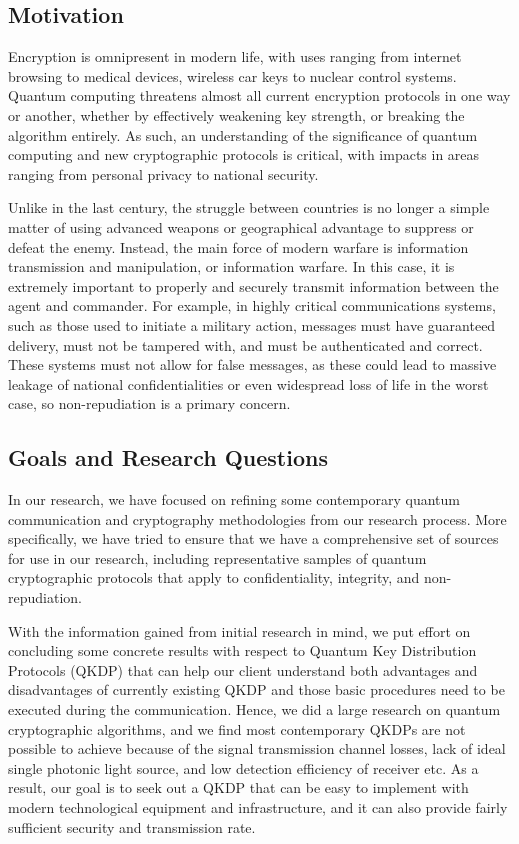 \documentclass[sigconf]{acmart}
\begin{document}
\subsection{Motivation}
Encryption is omnipresent in modern life, with uses ranging from internet browsing to medical devices, wireless car keys to nuclear control systems. Quantum computing threatens almost all current encryption protocols in one way or another, whether by effectively weakening key strength, or breaking the algorithm entirely. As such, an understanding of the significance of quantum computing and new cryptographic protocols is critical, with impacts in areas ranging from personal privacy to national security.

Unlike in the last century, the struggle between countries is no longer a simple matter of using advanced weapons or geographical advantage to suppress or defeat the enemy. Instead, the main force of modern warfare is information transmission and manipulation, or information warfare.
In this case, it is extremely important to properly and securely transmit information between the agent and commander. For example, in highly critical communications systems, such as those used to initiate a military action, messages must have guaranteed delivery, must not be tampered with, and must be authenticated and correct. These systems must not allow for false messages, as these could lead to massive leakage of national confidentialities or even widespread loss of life in the worst case, so non-repudiation is a primary concern. %
 
\subsection{Goals and Research Questions}
In our research, we have focused on refining some contemporary quantum communication and cryptography methodologies from our research process. More specifically, we have tried to ensure that we have a comprehensive set of sources for use in our research, including representative samples of quantum cryptographic protocols that apply to confidentiality, integrity, and non-repudiation.

With the information gained from initial research in mind, we put effort on concluding some concrete results with respect to Quantum Key Distribution Protocols (QKDP) that can help our client understand both advantages and disadvantages of currently existing QKDP and those basic procedures need to be executed during the communication. Hence, we did a large research on quantum cryptographic algorithms, and we find most contemporary QKDPs are not possible to achieve because of the signal transmission channel losses, lack of ideal single photonic light source, and low detection efficiency of receiver etc. As a result, our goal is to seek out a QKDP that can be easy to implement with modern technological equipment and infrastructure, and it can also provide fairly sufficient security and transmission rate. 
\end{document}
